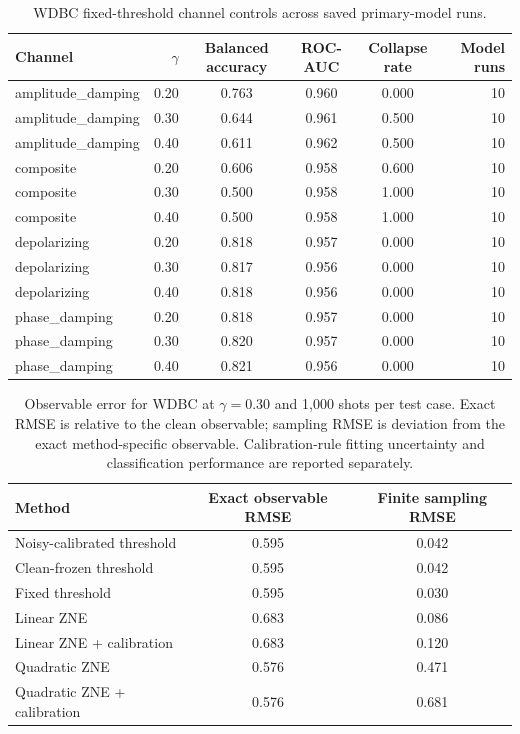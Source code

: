 \documentclass[10pt]{article}
\begin{document}
\begin{table}[H]
\centering
\caption{WDBC fixed-threshold channel controls across saved primary-model runs.}
\label{tab:channels}
\begin{tabular}{@{}l r c c c r@{}}
\toprule
Channel & $\gamma$ & Balanced accuracy & ROC-AUC & Collapse rate & Model runs \\
\midrule
amplitude\_damping & 0.20 & 0.763 & 0.960 & 0.000 & 10 \\
amplitude\_damping & 0.30 & 0.644 & 0.961 & 0.500 & 10 \\
amplitude\_damping & 0.40 & 0.611 & 0.962 & 0.500 & 10 \\
composite & 0.20 & 0.606 & 0.958 & 0.600 & 10 \\
composite & 0.30 & 0.500 & 0.958 & 1.000 & 10 \\
composite & 0.40 & 0.500 & 0.958 & 1.000 & 10 \\
depolarizing & 0.20 & 0.818 & 0.957 & 0.000 & 10 \\
depolarizing & 0.30 & 0.817 & 0.956 & 0.000 & 10 \\
depolarizing & 0.40 & 0.818 & 0.956 & 0.000 & 10 \\
phase\_damping & 0.20 & 0.818 & 0.957 & 0.000 & 10 \\
phase\_damping & 0.30 & 0.820 & 0.957 & 0.000 & 10 \\
phase\_damping & 0.40 & 0.821 & 0.956 & 0.000 & 10 \\
\bottomrule
\end{tabular}
\end{table}

\begin{table}[H]
\centering
\caption{Observable error for WDBC at $\gamma=0.30$ and 1,000 shots per test case. Exact RMSE is relative to the clean observable; sampling RMSE is deviation from the exact method-specific observable. Calibration-rule fitting uncertainty and classification performance are reported separately.}
\label{tab:errors}
\begin{tabular}{@{}l c c@{}}
\toprule
Method & Exact observable RMSE & Finite sampling RMSE \\
\midrule
Noisy-calibrated threshold & 0.595 & 0.042 \\
Clean-frozen threshold & 0.595 & 0.042 \\
Fixed threshold & 0.595 & 0.030 \\
Linear ZNE & 0.683 & 0.086 \\
Linear ZNE + calibration & 0.683 & 0.120 \\
Quadratic ZNE & 0.576 & 0.471 \\
Quadratic ZNE + calibration & 0.576 & 0.681 \\
\bottomrule
\end{tabular}
\end{table}
\end{document}
